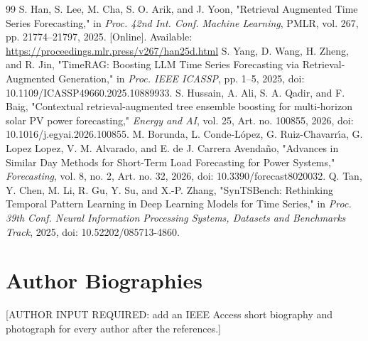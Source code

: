 \documentclass{ieeeaccess}
\begin{document}
\begin{thebibliography}{99}
 S. Han, S. Lee, M. Cha, S. O. Arik, and J. Yoon, "Retrieval Augmented Time Series Forecasting," in \emph{Proc. 42nd Int. Conf. Machine Learning}, PMLR, vol. 267, pp. 21774--21797, 2025. [Online]. Available: \url{https://proceedings.mlr.press/v267/han25d.html}
 S. Yang, D. Wang, H. Zheng, and R. Jin, "TimeRAG: Boosting LLM Time Series Forecasting via Retrieval-Augmented Generation," in \emph{Proc. IEEE ICASSP}, pp. 1--5, 2025, doi: 10.1109/ICASSP49660.2025.10889933.
 S. Hussain, A. Ali, S. A. Qadir, and F. Baig, "Contextual retrieval-augmented tree ensemble boosting for multi-horizon solar PV power forecasting," \emph{Energy and AI}, vol. 25, Art. no. 100855, 2026, doi: 10.1016/j.egyai.2026.100855.
 M. Borunda, L. Conde-López, G. Ruiz-Chavarr\'{\i}a, G. Lopez Lopez, V. M. Alvarado, and E. de J. Carrera Avenda\~{n}o, "Advances in Similar Day Methods for Short-Term Load Forecasting for Power Systems," \emph{Forecasting}, vol. 8, no. 2, Art. no. 32, 2026, doi: 10.3390/forecast8020032.
 Q. Tan, Y. Chen, M. Li, R. Gu, Y. Su, and X.-P. Zhang, "SynTSBench: Rethinking Temporal Pattern Learning in Deep Learning Models for Time Series," in \emph{Proc. 39th Conf. Neural Information Processing Systems, Datasets and Benchmarks Track}, 2025, doi: 10.52202/085713-4860.
\end{thebibliography}
\section*{Author Biographies}

{[}AUTHOR INPUT REQUIRED: add an IEEE Access short biography and photograph for every author after the references.{]}

\EOD
\end{document}
